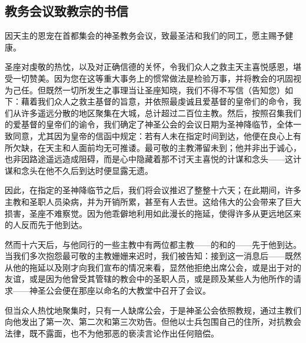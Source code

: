 
\subsection{教务会议致教宗的书信}

因天主的恩宠在首都集会的神圣教务会议，致最圣洁和我们的同工，愿主赐予健康。\par

圣座对虔敬的热忱，以及对正确信德的关怀，令我们众人之救主天主喜悦感恩，堪受一切赞美。因为您在这等重大事务上的惯常做法是检验万事，并将教会的巩固视为己任。但既然一切所发生之事理当让圣座知晓，我们不得不写信（告知您）如下：藉着我们众人之救主基督的旨意，并依照最虔诚且爱基督的皇帝们的命令，我们从许多遥远分散的地区聚集在大城，总计超过二百位主教。然后，按照召集我们的爱基督的皇帝们的谕令，我们确定了神圣公会的会议日期为圣神降临节，全体一致同意，尤其因为皇帝的信函中规定：若有人未在指定时间到达，他便在良心上有所欠缺，在天主和人面前均无可推诿。最可敬的主教滞留未到；他并非出于诚心，也非因路途遥远造成阻碍，而是心中隐藏着那不讨天主喜悦的计谋和念头——这计谋和念头在他不久后到达时便显露无遗。\newline{}\par

因此，在指定的圣神降临节之后，我们将会议推迟了整整十六天；在此期间，许多主教和圣职人员染病，并为开销所累，甚至有人去世。这给伟大的公会带来了巨大损害，圣座不难察觉。因为他乖僻地利用如此漫长的拖延，使得许多从更远地区来的人反而先于他到达。\newline{}\par

然而十六天后，与他同行的一些主教中有两位都主教——的和的——先于他到达。当我们多次抱怨最可敬的主教姗姗来迟时，我们被告知：接到这一消息后——既然从他的拖延以及刚才向我们宣布的情况来看，显然他拒绝出席公会，或是出于对的友谊，或是因为他曾受其管辖的教会中的圣职人员，或是顾及某些人为他所作的请求——神圣公会便在那座以命名的大教堂中召开了会议。\newline{}\par

但当众人热忱地聚集时，只有一人缺席公会，于是神圣公会依照教规，通过主教们向他发出了第一次、第二次和第三次劝告。但他以士兵包围自己的住所，对抗教会法律，既不露面，也不为他邪恶的亵渎言论作出任何赔偿。\newline{}\par

